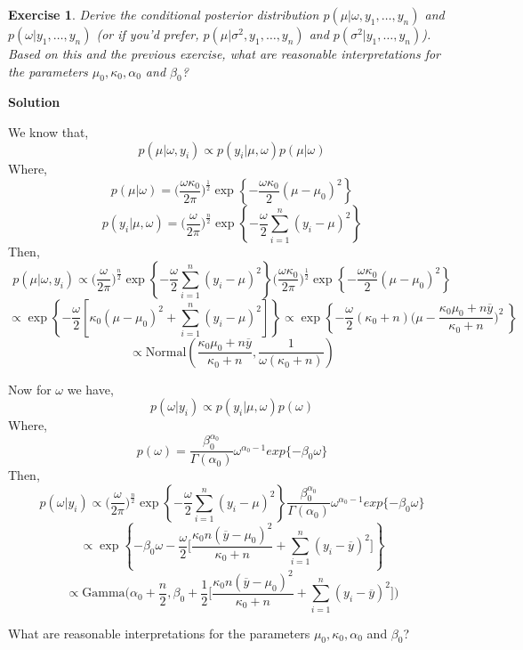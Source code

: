 \documentclass[twoside]{article}
\newcounter{lecnum}
\newtheorem{exercise}{Exercise}[lecnum]
\begin{document}
\color{black}

\begin{exercise}
  Derive the conditional posterior distribution $p(\mu|\omega,y_1,\dots, y_n)$ and $p(\omega|y_1,\dots, y_n)$ (or if you'd prefer, $p(\mu|\sigma^2, y_1,\dots, y_n)$ and $p(\sigma^2|y_1,\dots, y_n)$). Based on this and the previous exercise, what are reasonable interpretations for the parameters $\mu_0,\kappa_0, \alpha_0$ and $\beta_0$?
\end{exercise}


\color{blue}
\textbf{Solution}

We know that,
$$ p(\mu|\omega,y_i) \propto  p(y_i |\mu,\omega) p(\mu|\omega)  $$
Where,
$$ p(\mu | \omega) = \bigg(\frac{\omega \kappa_0}{ 2 \pi} \bigg)^{\frac{1}{2}} \exp\left\{ -\frac{\omega \kappa_0}{2} (\mu - \mu_0)^2 \right\}  $$
$$  p(y_i|\mu, \omega) = \bigg(\frac{\omega}{ 2 \pi} \bigg)^{\frac{n}{2}} \exp\left\{ -\frac{\omega}{2} \sum_{i=1}^{n} (y_i - \mu)^2 
\right\}  $$
Then,
$$ p(\mu|\omega,y_i)  \propto 
 \bigg(\frac{\omega}{ 2 \pi} \bigg)^{\frac{n}{2}} \exp\left\{ -\frac{\omega}{2} \sum_{i=1}^{n} (y_i - \mu)^2 \right\} 
\bigg(\frac{\omega \kappa_0}{ 2 \pi} \bigg)^{\frac{1}{2}} \exp\left\{ -\frac{\omega \kappa_0}{2} (\mu - \mu_0)^2 \right\} $$
$$ \propto \exp\left\{ -\frac{\omega }{2}[ \kappa_0 (\mu - \mu_0)^2 + \sum_{i=1}^{n} (y_i - \mu)^2 ] \right\} 
\propto \exp\left\{ -\frac{\omega}{2}  (\kappa_0 + n)  \bigg( \mu - \frac{\kappa_0 \mu_0 + n\overline{y}}{\kappa_0 + n} \bigg)^2 \ \right\} $$
$$ \propto
\mbox{Normal}\left( \frac{\kappa_0 \mu_0 + n\overline{y}}{\kappa_0 + n},  \frac{1}{\omega(\kappa_0 + n)}
\right)  $$

Now for $\omega$ we have,
$$ p(\omega|y_i) \propto p(y_i|\mu, \omega) p(\omega) $$
Where,
$$p(\omega) = \frac{\beta_0^{\alpha_0}}{\Gamma (\alpha_0) }\omega^{\alpha_0-1} exp\{-\beta_0 \omega\}$$
Then,
$$p(\omega|y_i)  \propto \bigg(\frac{\omega}{ 2 \pi} \bigg)^{\frac{n}{2}} \exp\left\{ -\frac{\omega}{2} \sum_{i=1}^{n} (y_i - \mu)^2 
\right\} \frac{\beta_0^{\alpha_0}}{\Gamma (\alpha_0) }\omega^{\alpha_0-1} exp\{-\beta_0 \omega\} $$
$$\propto  \exp\left\{ -\beta_0 \omega
-\frac{\omega}{2} \bigg[
\frac{\kappa_0 n (\overline{y}-\mu_0)^2}{\kappa_0+n} + \sum_{i=1}^{n} (y_i - \overline{y})^2 \bigg]
\right\}  $$
$$ \propto \mbox{Gamma}\bigg(\alpha_0 + \frac{n}{2}, \beta_0 + \frac{1}{2} \bigg[
\frac{\kappa_0 n (\overline{y}-\mu_0)^2}{\kappa_0+n} + \sum_{i=1}^{n} (y_i - \overline{y})^2 \bigg] \bigg)
$$

What are reasonable interpretations for the parameters $\mu_0,\kappa_0, \alpha_0$ and $\beta_0$?
\end{document}

